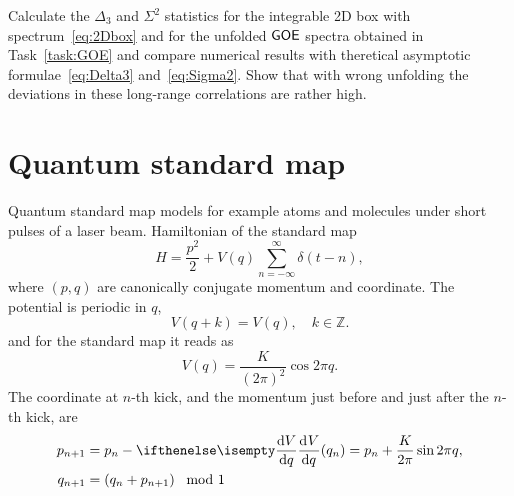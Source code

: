 \documentclass[a4paper,11pt,twoside]{article}
\begin{document}
    \begin{task}
        Calculate the $\Delta_{3}$ and $\Sigma^{2}$ statistics for the integrable 2D box with spectrum~\eqref{eq:2Dbox} and for the unfolded $\mathsf{GOE}$ spectra obtained in Task~\ref{task:GOE} and compare numerical results with theretical asymptotic formulae~\eqref{eq:Delta3} and~\eqref{eq:Sigma2}.
        Show that with wrong unfolding the deviations in these long-range correlations are rather high.
    \end{task}

\section{Quantum standard map}
    Quantum standard map models for example atoms and molecules under short pulses of a laser beam.
    Hamiltonian of the standard map
    \begin{equation}
        H=\frac{p^{2}}{2}+V(q)\sum_{n=-\infty}^{\infty}\delta(t-n),
    \end{equation}
    where $(p,q)$ are canonically conjugate momentum and coordinate.
    The potential is periodic in $q$,
    \begin{equation}
        V(q+k)=V(q),\quad k\in\mathbb{Z}.
    \end{equation}
    and for the standard map it reads as
    \begin{equation}
        V(q)=\frac{K}{(2\pi)^{2}}\cos{2\pi q}.
    \end{equation}
    The coordinate at $n$-th kick, and the momentum just before and just after the $n$-th kick, are
    \begin{subequations}
        \begin{align}
            p_{n+1}&=p_{n}-\derivative{V}{q}(q_{n})=p_{n}+\frac{K}{2\pi}\sin{2\pi q},\\
            q_{n+1}&=\left(q_{n}+p_{n+1}\right)\mod{1}
        \end{align}
    \end{subequations}
\end{document}
